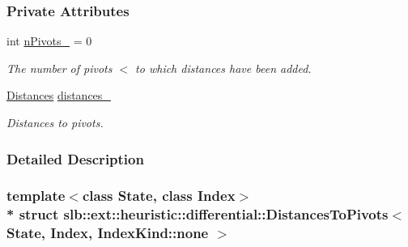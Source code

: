 \subsubsection*{Private Attributes}
\begin{DoxyCompactItemize}
\item 
int \hyperlink{structslb_1_1ext_1_1heuristic_1_1differential_1_1DistancesToPivots_3_01State_00_01Index_00_01IndexKind_1_1none_01_4_ada16b37eefe345e3bda862e3550cf997}{n\+Pivots\+\_\+} = 0\hypertarget{structslb_1_1ext_1_1heuristic_1_1differential_1_1DistancesToPivots_3_01State_00_01Index_00_01IndexKind_1_1none_01_4_ada16b37eefe345e3bda862e3550cf997}{}\label{structslb_1_1ext_1_1heuristic_1_1differential_1_1DistancesToPivots_3_01State_00_01Index_00_01IndexKind_1_1none_01_4_ada16b37eefe345e3bda862e3550cf997}

\begin{DoxyCompactList}\small\item\em The number of pivots $<$ to which distances have been added. \end{DoxyCompactList}\item 
\hyperlink{structslb_1_1ext_1_1heuristic_1_1differential_1_1DistancesToPivots_3_01State_00_01Index_00_01IndexKind_1_1none_01_4_ad9594df4b94a787fdb75d0ed2617d276}{Distances} \hyperlink{structslb_1_1ext_1_1heuristic_1_1differential_1_1DistancesToPivots_3_01State_00_01Index_00_01IndexKind_1_1none_01_4_a86393e0db863e02672fd684342538526}{distances\+\_\+}\hypertarget{structslb_1_1ext_1_1heuristic_1_1differential_1_1DistancesToPivots_3_01State_00_01Index_00_01IndexKind_1_1none_01_4_a86393e0db863e02672fd684342538526}{}\label{structslb_1_1ext_1_1heuristic_1_1differential_1_1DistancesToPivots_3_01State_00_01Index_00_01IndexKind_1_1none_01_4_a86393e0db863e02672fd684342538526}

\begin{DoxyCompactList}\small\item\em Distances to pivots. \end{DoxyCompactList}\end{DoxyCompactItemize}


\subsubsection{Detailed Description}
\subsubsection*{template$<$class State, class Index$>$\\*
struct slb\+::ext\+::heuristic\+::differential\+::\+Distances\+To\+Pivots$<$ State, Index, Index\+Kind\+::none $>$}

